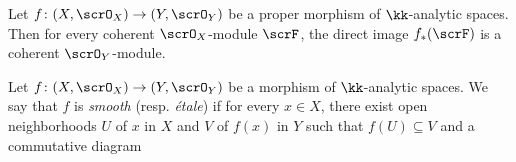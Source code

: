     \begin{theorem}\label{thm:direct_image_under_proper_morphism_is_coherent}
        Let \(f \colon (X, \scrO_X) \to (Y, \scrO_Y)\) be a proper morphism of \(\kk\)-analytic spaces. 
        Then for every coherent \(\scrO_X\)-module \(\scrF\), the direct image \(f_*(\scrF)\) is a coherent \(\scrO_Y\)-module.
        \Yang{}
    \end{theorem}

    \begin{definition}\label{def:smooth_etale_morphism_between_analytic_space}
        Let \(f \colon (X, \scrO_X) \to (Y, \scrO_Y)\) be a morphism of \(\kk\)-analytic spaces. 
        We say that \(f\) is \emph{smooth} (resp. \emph{étale}) if for every \(x \in X\), there exist open neighborhoods \(U\) of \(x\) in \(X\) and \(V\) of \(f(x)\) in \(Y\) such that \(f(U) \subseteq V\) and a commutative diagram
        \Yang{}
    \end{definition}